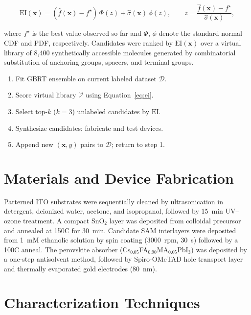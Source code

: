\documentclass[12pt,a4paper,oneside]{report}
\begin{document}
\begin{equation}
\mathrm{EI}(\mathbf{x}) = \left(\hat{f}(\mathbf{x}) - f^{\star}\right)\,
\Phi(z) + \hat{\sigma}(\mathbf{x})\,\phi(z), \qquad
z = \frac{\hat{f}(\mathbf{x}) - f^{\star}}{\hat{\sigma}(\mathbf{x})},
\label{eq:ei}
\end{equation}

where $f^{\star}$ is the best value observed so far and $\Phi$, $\phi$
denote the standard normal CDF and PDF, respectively. Candidates were
ranked by $\mathrm{EI}(\mathbf{x})$ over a virtual library of 8{,}400
synthetically accessible molecules generated by combinatorial substitution
of anchoring groups, spacers, and terminal groups.

\begin{keybox}[title=Algorithm 3.1 --- Closed-Loop Candidate Selection]
\begin{enumerate}[leftmargin=*, itemsep=2pt]
\item Fit GBRT ensemble on current labeled dataset $\mathcal{D}$.
\item Score virtual library $\mathcal{V}$ using Equation~\eqref{eq:ei}.
\item Select top-$k$ ($k=3$) unlabeled candidates by $\mathrm{EI}$.
\item Synthesize candidates; fabricate and test devices.
\item Append new $(\mathbf{x}, y)$ pairs to $\mathcal{D}$; return to step 1.
\end{enumerate}
\end{keybox}

\section{Materials and Device Fabrication}

Patterned ITO substrates were sequentially cleaned by ultrasonication in
detergent, deionized water, acetone, and isopropanol, followed by 15~min
UV--ozone treatment. A compact SnO$_2$ layer was deposited from
colloidal precursor and annealed at 150\textdegree C for 30~min. Candidate
SAM interlayers were deposited from 1~mM ethanolic solution by spin
coating (3000~rpm, 30~s) followed by a 100\textdegree C anneal. The
perovskite absorber (Cs$_{0.05}$FA$_{0.90}$MA$_{0.05}$PbI$_3$) was
deposited by a one-step antisolvent method, followed by Spiro-OMeTAD hole
transport layer and thermally evaporated gold electrodes (80~nm).

\section{Characterization Techniques}
\end{document}
